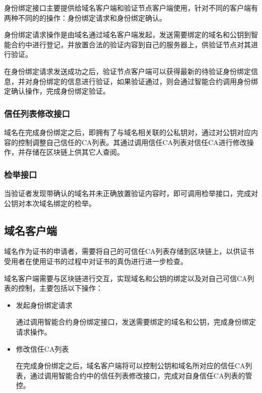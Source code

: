 身份绑定接口主要提供给域名客户端和验证节点客户端使用，针对不同的客户端有两种不同的的操作：身份绑定请求和身份绑定确认。

身份绑定请求操作是由域名通过域名客户端发起，发送需要绑定的域名和公钥到智能合约中进行登记，并放置合法的验证内容到自己的服务器上，供验证节点对其进行验证。

在身份绑定请求发送成功之后，验证节点客户端可以获得最新的待验证身份绑定信息，并对身份绑定的信息进行验证，如果验证通过，则会通过智能合约调用身份绑定确认操作，完成身份绑定验证。

\subsubsection{信任列表修改接口}

域名在完成身份绑定之后，即拥有了与域名相关联的公私钥对，通过对公钥对应内容的控制调整自己信任的CA列表。其通过调用信任CA列表对信任CA进行修改操作，并存储在区块链上供其它人查阅。


\subsubsection{检举接口}

当验证者发现带确认的域名并未正确放置验证内容时，即可调用检举接口，完成对公钥对本次域名绑定的检举。

\subsection{域名客户端}

域名作为证书的申请者，需要将自己的可信任CA列表存储到区块链上，以供证书受用者在使用证书的过程中对证书的真伪进行进一步检查。

域名客户端需要与区块链进行交互，实现域名和公钥的绑定以及对自己可信CA列表的控制，主要包括以下操作：

\begin{itemize}
	\item 

	发起身份绑定请求

	通过调用智能合约身份绑定接口，发送需要绑定的域名和公钥，完成身份绑定请求操作。

	\item 

	修改信任CA列表

	在完成身份绑定之后，域名客户端将可以控制公钥和域名所对应的信任CA列表，通过调用智能合约中的信任列表修改接口，完成对自身信任CA列表的管控。


\end{itemize}

